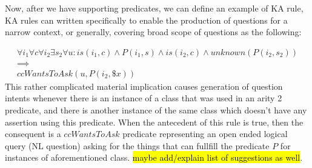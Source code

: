Now, after we have supporting predicates, we can define an example of KA rule, 
KA rules can written specifically to enable the production of questions for a 
narrow context, or generally, covering broad scope of questions as the
following:

\begin{equation}\label{as:generalRule}
\begin{gathered}
\forall i_1 \forall c \forall i_2 \exists s_2 \forall u:is(i_1,c) \land P(i_1,s) \land is(i_2,c)\land unknown(P(i_2,s_2)) \\ 
	\implies \\
ccWantsToAsk(u,P(i_2,\$x))
\end{gathered}
\end{equation}
This rather complicated material implication causes generation of question 
intents whenever there is an instance of a class that was used in an arity 2 
predicate, and there is another instance of the same class which doesn’t have 
any assertion using this predicate. When the antecedent of this rule is true,
then the consequent is a $ccWantsToAsk$ predicate representing an open
ended logical query (NL question) asking for the things that can fullfill the
predicate $P$ for instances of aforementioned class. \hl{maybe add/explain
list of suggestions as well}.

